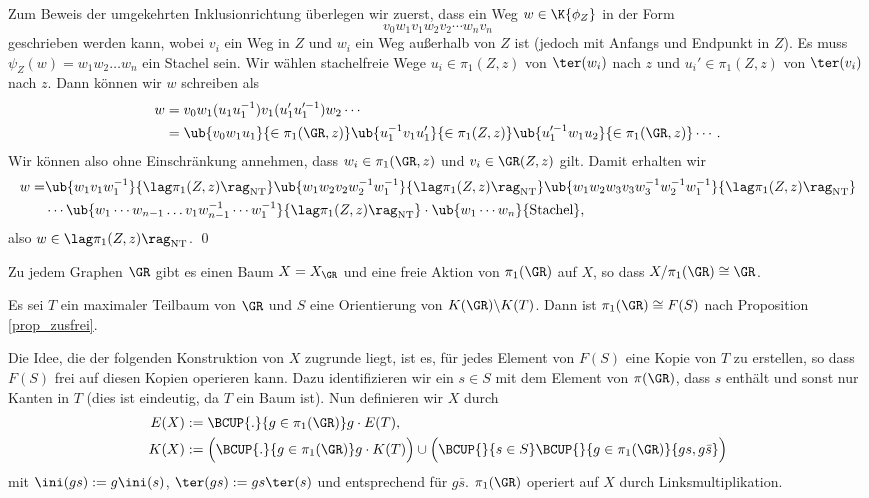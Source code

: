 Zum Beweis der umgekehrten Inklusionrichtung überlegen wir zuerst,
dass ein Weg $w\in \K{\phi_Z}$ in der Form
\[
v_0 w_1 v_1 w_2 v_2 \cdots w_n v_n
\]
geschrieben werden kann, wobei $v_i$ ein Weg in $Z$ und $w_i$ ein
Weg außerhalb von $Z$ ist (jedoch mit Anfangs und Endpunkt in $Z$).
Es muss $\psi_Z(w)=w_1 w_2 \ldots w_n$ ein Stachel sein.
Wir wählen stachelfreie Wege $u_i\in\pi_1(Z,z)$ von $\ter(w_i)$ nach
$z$ und $u_i'\in\pi_1(Z,z)$ von $\ter(v_i)$ nach $z$.
Dann können wir $w$ schreiben als
\begin{align*}
w &= v_0 w_1 (u_1 u_1^{-1}) v_1 (u_1' u_1'^{-1}) w_2 \cdots \\
&=\ub{v_0 w_1 u_1}{\in \pi_1(\GR,z)}
\ub{u_1^{-1} v_1 u_1'}{\in \pi_1(Z,z)}
\ub{u_1'^{-1} w_1 u_2}{\in \pi_1(\GR,z)} \cdots .
\end{align*}
Wir können also ohne Einschränkung annehmen, dass
$w_i\in\pi_1(\GR,z)$ und $v_i\in\GR(Z,z)$ gilt. Damit erhalten wir
\begin{align*}
w =&
\ub{w_1 v_1 w_1^{-1}}{\lag \pi_1(Z,z)\rag_{\mathrm{NT}}}
\ub{w_1 w_2 v_2 w_2^{-1} w_1^{-1}}{\lag \pi_1(Z,z)\rag_{\mathrm{NT}}}
\ub{w_1 w_2 w_3 v_3 w_3^{-1} w_2^{-1} w_1^{-1}}{\lag \pi_1(Z,z)\rag_{\mathrm{NT}}}\\
&\cdots
\ub{w_1\cdots w_{n-1}\ldots v_1 w_{n-1}^{-1}\cdots w_1^{-1}}{\lag \pi_1(Z,z)\rag_{\mathrm{NT}}}
\cdot
\ub{w_1\cdots w_n}{\text{Stachel}},
\end{align*}
also $w\in\lag \pi_1(Z,z)\rag_{\mathrm{NT}}$.
\qed

\PROP Zu jedem Graphen $\GR$ gibt es einen Baum $X=X_{\GR}$ und eine
freie Aktion von $\pi_1(\GR)$ auf $X$, so dass
$X/\pi_1(\GR)\cong \GR$.

\bew
Es sei $T$ ein maximaler Teilbaum von $\GR$ und $S$ eine Orientierung
von $K(\GR)\backslash K(T)$. Dann ist $\pi_1(\GR)\cong F(S)$
nach Proposition \ref{prop_zusfrei}.

Die Idee, die der folgenden Konstruktion von $X$ zugrunde liegt,
ist es, für jedes Element von $F(S)$ eine Kopie von
$T$ zu erstellen, so dass $F(S)$ frei auf diesen Kopien operieren
kann. Dazu identifizieren wir ein $s\in S$ mit dem Element
von $\pi(\GR)$, dass $s$ enthält und sonst nur Kanten in $T$
(dies ist eindeutig, da $T$ ein Baum ist).
Nun definieren wir $X$ durch
\begin{align*}
E(X) &:= \BCUP{.}{g\in\pi_1(\GR)} g\cdot E(T), \\
K(X) &:= \Bigl(\BCUP{.}{g\in\pi_1(\GR)} g\cdot K(T)\Bigr)
\cup
\Bigl(\BCUP{}{s\in S}\BCUP{}{g\in\pi_1(\GR)} \{gs, g\bar{s} \}\Bigr)
\end{align*}
mit $\ini(gs):=g\ini(s)$, $\ter(gs):=gs\ter(s)$ und entsprechend
für $g\bar{s}$.
$\pi_1(\GR)$ operiert auf $X$ durch Linksmultiplikation.

